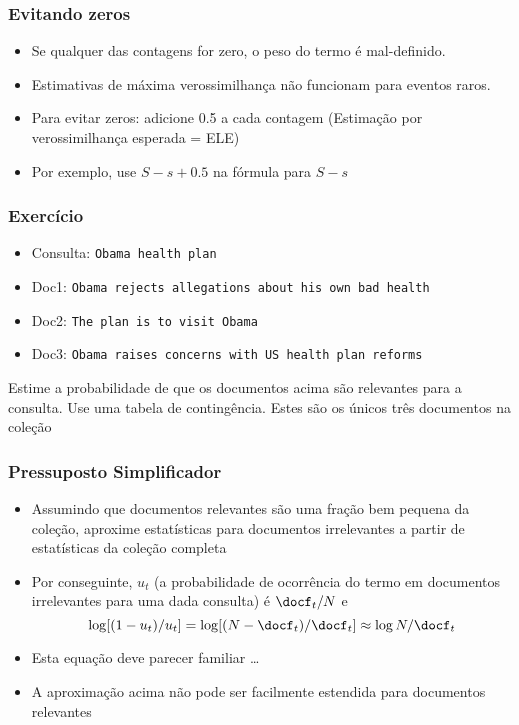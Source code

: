 \documentclass[compress]{beamer}
\def\myblue#1{\textcolor{texblue}{#1}}
\begin{document}
\begin{frame}[<+->]
\frametitle{Evitando zeros}
\pause[2]

\begin{itemize}
\item Se qualquer das contagens for zero, o peso do termo é mal-definido.
\item Estimativas de máxima verossimilhança não funcionam para eventos raros.
\item Para evitar zeros: \myblue{adicione 0.5 a cada contagem}
  (Estimação por verossimilhança esperada = ELE)
\item Por exemplo, use $S-s+0.5$ na fórmula para $S-s$
\end{itemize}

\end{frame}

\begin{frame}
\frametitle{Exercício}
\pause

\begin{itemize}
\item Consulta: \texttt{Obama health plan}
\item Doc1: \texttt{Obama rejects allegations about his own bad health}
\item Doc2: \texttt{The plan is to visit Obama}
\item Doc3: \texttt{Obama raises concerns with US health plan reforms}
\end{itemize}
\pause
Estime a probabilidade de que os documentos acima são relevantes para a consulta. Use uma tabela de contingência. Estes são os únicos três documentos na coleção
\end{frame} 

\begin{frame}[<+->]
\frametitle{Pressuposto Simplificador}
\pause[2]

\begin{itemize}\item Assumindo que documentos relevantes são uma fração bem pequena da coleção, aproxime estatísticas para documentos irrelevantes a partir de estatísticas da coleção completa

\item Por conseguinte, $u_t$ (a probabilidade de ocorrência do termo em documentos irrelevantes para uma dada consulta) é $\docf_t/N$ e
\begin{equation}
\nonumber
\log [(1-u_t)/u_t] = \log [(N-\docf_t)/\docf_t] \approx \log N/\docf_t 
\end{equation}

\item Esta equação deve parecer familiar \ldots

\item A aproximação acima não pode ser facilmente estendida para documentos relevantes
\end{itemize}
\end{frame}
\end{document}

